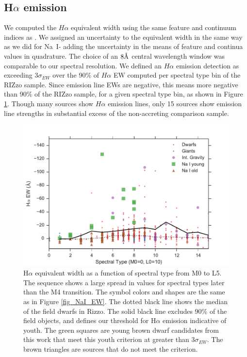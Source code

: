 \documentclass[12pt,preprint]{aastex}
\newcommand{\angstrom}{\mbox{\normalfont\AA}}
\begin{document}
\subsection{H$\alpha$ emission}
We computed the $H\alpha$ equivalent width using the same feature and continuum indices as \citet{2011AJ....141...97W}.  We assigned an uncertainty to the equivalent width in the same way as we did for Na~I- adding the uncertainty in the means of feature and continua values in quadrature.  The choice of an $8 \angstrom$ central wavelength window was comparable to our spectral resolution.  We defined an $H\alpha$ emission detection as exceeding 3$\sigma_{EW}$ over the 90\% of $H\alpha$ EW computed per spectral type bin of the RIZzo sample.  Since emission line EWs are negative, this means more negative than 90\% of the RIZzo sample, for a given spectral type bin, as shown in Figure \ref{fig_Ha_EW}.  Though many sources show $H\alpha$ emission lines, only 15 sources show emission line strengths in substantial excess of the non-accreting comparison sample.

\begin{figure}[ht!]
  \caption{H$\alpha$ equivalent width as a function of spectral type from M0 to L5.  The sequence shows a large spread in values for spectral types later than the M4 transition.  The symbol colors and shapes are the same as in Figure \ref{fig_NaI_EW}.  The dotted black line shows the median of the field dwarfs in Rizzo.  The solid black line excludes 90\% of the field objects, and defines our threshold for H$\alpha$ emission indicative of youth.  The green squares are young brown dwarf candidates from this work that meet this youth criterion at greater than $3\sigma_{EW}$.  The brown triangles are sources that do not meet the criterion. \label{fig_Ha_EW} }
\centering
\includegraphics[scale=0.6]{figures/Ha_EW}
\end{figure}
\end{document}
